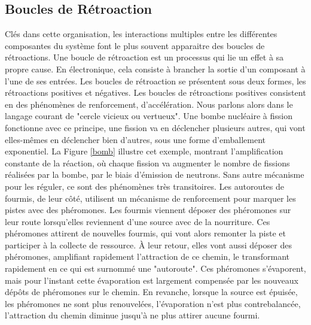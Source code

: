 			\subsection{Boucles de Rétroaction}
		
		Clés dans cette organisation, les interactions multiples entre les différentes composantes du système font le plus souvent apparaitre des boucles de rétroactions. Une boucle de rétroaction est un processus qui lie un effet à sa propre cause. En électronique, cela consiste à brancher la sortie d'un composant à l'une de ses entrées. Les boucles de rétroaction se présentent sous deux formes, les rétroactions positives et négatives. Les boucles de rétroactions positives consistent en des phénomènes de renforcement, d'accélération. Nous parlons alors dans le langage courant de "cercle vicieux ou vertueux". Une bombe nucléaire à fission fonctionne avec ce principe, une fission va en déclencher plusieurs autres, qui vont elles-mêmes en déclencher bien d'autres, sous une forme d'emballement exponentiel. La Figure \ref{bomb} illustre cet exemple, montrant l'amplification constante de la réaction, où chaque fission va augmenter le nombre de fissions réalisées par la bombe, par le biais d'émission de neutrons. Sans autre mécanisme pour les réguler, ce sont des phénomènes très transitoires. Les autoroutes de fourmis, de leur côté, utilisent un mécanisme de renforcement pour marquer les pistes avec des phéromones. Les fourmis viennent déposer des phéromones sur leur route lorsqu'elles reviennent d'une source avec de la nourriture. Ces phéromones attirent de nouvelles fourmis, qui vont alors remonter la piste et participer à la collecte de ressource. À leur retour, elles vont aussi déposer des phéromones, amplifiant rapidement l'attraction de ce chemin, le transformant rapidement en ce qui est surnommé une "autoroute". Ces phéromones s'évaporent, mais pour l'instant cette évaporation est largement compensée par les nouveaux dépôts de phéromones sur le chemin. En revanche, lorsque la source est épuisée, les phéromones ne sont plus renouvelées, l'évaporation n'est plus contrebalancée, l'attraction du chemin diminue jusqu'à ne plus attirer aucune fourmi.
